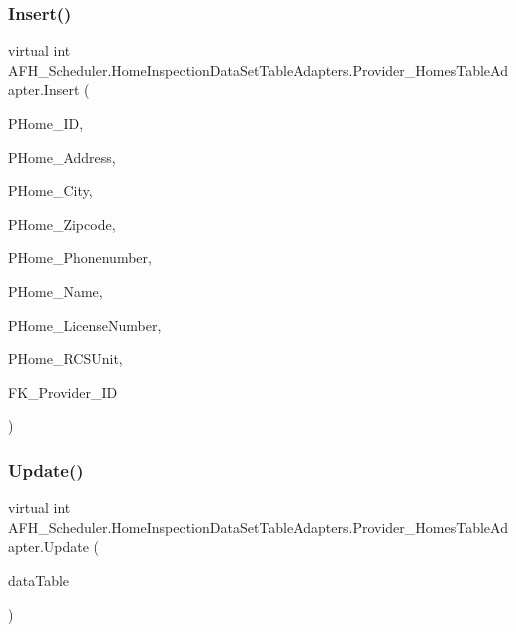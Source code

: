 \subsubsection{Insert()}
{\footnotesize\ttfamily virtual int A\+F\+H\+\_\+\+Scheduler.\+Home\+Inspection\+Data\+Set\+Table\+Adapters.\+Provider\+\_\+\+Homes\+Table\+Adapter.\+Insert (\begin{DoxyParamCaption}\item[{long}]{P\+Home\+\_\+\+ID,  }\item[{string}]{P\+Home\+\_\+\+Address,  }\item[{string}]{P\+Home\+\_\+\+City,  }\item[{string}]{P\+Home\+\_\+\+Zipcode,  }\item[{string}]{P\+Home\+\_\+\+Phonenumber,  }\item[{string}]{P\+Home\+\_\+\+Name,  }\item[{string}]{P\+Home\+\_\+\+License\+Number,  }\item[{string}]{P\+Home\+\_\+\+R\+C\+S\+Unit,  }\item[{global\+::\+System.\+Nullable$<$ long $>$}]{F\+K\+\_\+\+Provider\+\_\+\+ID }\end{DoxyParamCaption})\hspace{0.3cm}{\ttfamily [virtual]}}

\mbox{\label{class_a_f_h___scheduler_1_1_home_inspection_data_set_table_adapters_1_1_provider___homes_table_adapter_a51510fe1cb1c15f9c195fe4a5b66f1c1}} 
\subsubsection{Update()\hspace{0.1cm}{\footnotesize\ttfamily [1/6]}}
{\footnotesize\ttfamily virtual int A\+F\+H\+\_\+\+Scheduler.\+Home\+Inspection\+Data\+Set\+Table\+Adapters.\+Provider\+\_\+\+Homes\+Table\+Adapter.\+Update (\begin{DoxyParamCaption}\item[{\textbf{ Home\+Inspection\+Data\+Set.\+Provider\+\_\+\+Homes\+Data\+Table}}]{data\+Table }\end{DoxyParamCaption})\hspace{0.3cm}{\ttfamily [virtual]}}

